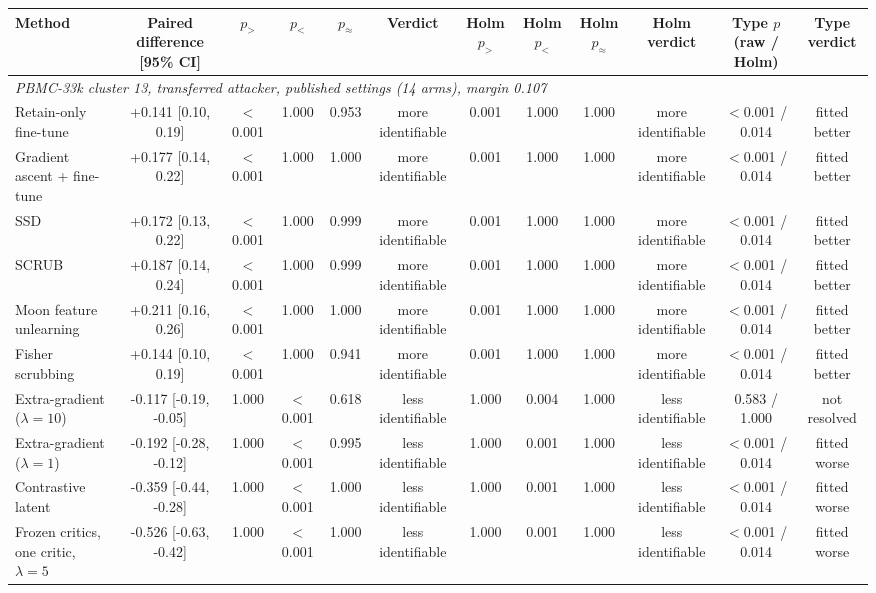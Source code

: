 \begin{tabular}{lccccccccccc}
\toprule
Method & Paired difference [95\% CI] & $p_{>}$ & $p_{<}$ & $p_{\approx}$ & Verdict & Holm $p_{>}$ & Holm $p_{<}$ & Holm $p_{\approx}$ & Holm verdict & Type $p$ (raw / Holm) & Type verdict \\
\midrule
\multicolumn{12}{l}{\emph{PBMC-33k cluster 13, transferred attacker, published settings (14 arms), margin 0.107}} \\
Retain-only fine-tune & +0.141 [0.10, 0.19] & $<$0.001 & 1.000 & 0.953 & more identifiable & 0.001 & 1.000 & 1.000 & more identifiable & $<$0.001 / 0.014 & fitted better \\
Gradient ascent + fine-tune & +0.177 [0.14, 0.22] & $<$0.001 & 1.000 & 1.000 & more identifiable & 0.001 & 1.000 & 1.000 & more identifiable & $<$0.001 / 0.014 & fitted better \\
SSD & +0.172 [0.13, 0.22] & $<$0.001 & 1.000 & 0.999 & more identifiable & 0.001 & 1.000 & 1.000 & more identifiable & $<$0.001 / 0.014 & fitted better \\
SCRUB & +0.187 [0.14, 0.24] & $<$0.001 & 1.000 & 0.999 & more identifiable & 0.001 & 1.000 & 1.000 & more identifiable & $<$0.001 / 0.014 & fitted better \\
Moon feature unlearning & +0.211 [0.16, 0.26] & $<$0.001 & 1.000 & 1.000 & more identifiable & 0.001 & 1.000 & 1.000 & more identifiable & $<$0.001 / 0.014 & fitted better \\
Fisher scrubbing & +0.144 [0.10, 0.19] & $<$0.001 & 1.000 & 0.941 & more identifiable & 0.001 & 1.000 & 1.000 & more identifiable & $<$0.001 / 0.014 & fitted better \\
Extra-gradient ($\lambda=10$) & -0.117 [-0.19, -0.05] & 1.000 & $<$0.001 & 0.618 & less identifiable & 1.000 & 0.004 & 1.000 & less identifiable & 0.583 / 1.000 & not resolved \\
Extra-gradient ($\lambda=1$) & -0.192 [-0.28, -0.12] & 1.000 & $<$0.001 & 0.995 & less identifiable & 1.000 & 0.001 & 1.000 & less identifiable & $<$0.001 / 0.014 & fitted worse \\
Contrastive latent & -0.359 [-0.44, -0.28] & 1.000 & $<$0.001 & 1.000 & less identifiable & 1.000 & 0.001 & 1.000 & less identifiable & $<$0.001 / 0.014 & fitted worse \\
Frozen critics, one critic, $\lambda=5$ & -0.526 [-0.63, -0.42] & 1.000 & $<$0.001 & 1.000 & less identifiable & 1.000 & 0.001 & 1.000 & less identifiable & $<$0.001 / 0.014 & fitted worse \\

\end{tabular}
